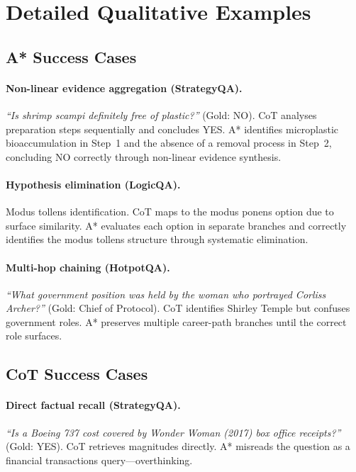 \documentclass{article}
\begin{document}
\newpage
\appendix

\section{Detailed Qualitative Examples}
\label{app:qualitative}

\subsection{A* Success Cases}

\paragraph{Non-linear evidence aggregation (StrategyQA).}
\emph{``Is shrimp scampi definitely free of plastic?''} (Gold: NO).
CoT analyses preparation steps sequentially and concludes YES.  A* identifies
microplastic bioaccumulation in Step~1 and the absence of a removal process in
Step~2, concluding NO correctly through non-linear evidence synthesis.

\paragraph{Hypothesis elimination (LogicQA).}
Modus tollens identification.  CoT maps to the modus ponens option due to
surface similarity.  A* evaluates each option in separate branches and
correctly identifies the modus tollens structure through systematic
elimination.

\paragraph{Multi-hop chaining (HotpotQA).}
\emph{``What government position was held by the woman who portrayed Corliss
Archer?''} (Gold: Chief of Protocol).  CoT identifies Shirley Temple but
confuses government roles.  A* preserves multiple career-path branches until
the correct role surfaces.

\subsection{CoT Success Cases}

\paragraph{Direct factual recall (StrategyQA).}
\emph{``Is a Boeing 737 cost covered by Wonder Woman (2017) box office
receipts?''} (Gold: YES).  CoT retrieves magnitudes directly.  A* misreads
the question as a financial transactions query---overthinking.
\end{document}
